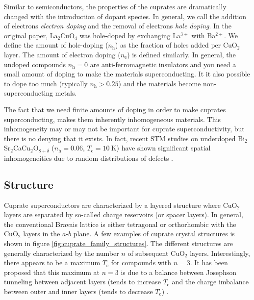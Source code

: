 Similar to semiconductors, the properties of the cuprates are dramatically changed with the introduction of dopant species. In general, we call the addition of electrons \emph{electron doping} and the removal of electrons \emph{hole doping}. In the original paper, La$_2$CuO$_4$ was hole-doped by exchanging La$^{3+}$ with Ba$^{2+}$. We define the amount of hole-doping ($n_\text{h}$) as the fraction of holes added per CuO$_2$ layer. The amount of electron doping ($n_\text{e}$) is defined similarly. In general, the undoped compounds $n_\text{h} = 0$ are anti-ferromagnetic insulators and you need a small amount of doping to make the materials superconducting. It it also possible to dope too much (typically $n_\text{h} > 0.25$) and the materials become non-superconducting metals.

The fact that we need finite amounts of doping in order to make cuprates superconducting, makes them inherently inhomogeneous materials. This inhomogeneity may or may not be important for cuprate superconductivity, but there is no denying that it exists. In fact, recent STM studies on underdoped Bi$_2$Sr$_2$CaCu$_2$O$_{8+\delta}$ ($n_\text{h} = 0.06$, $T_\text{c} = \SI{10}{\kelvin}$) have shown significant spatial inhomogeneities due to random distributions of defects \cite{Ruan2018}. %

\subsection{Structure}
Cuprate superconductors are characterized by a layered structure where CuO$_2$ layers are separated by so-called charge reservoirs (or spacer layers). In general, the conventional Bravais lattice is either tetragonal or orthorhombic with the CuO$_2$ layers in the $a$-$b$ plane. A few examples of cuprate crystal structures is shown in figure \ref{fig:cuprate_family_structures}. The different structures are generally characterized by the number $n$ of subsequent CuO$_2$ layers. Interestingly, there appears to be a maximum $T_\text{c}$ for compounds with $n=3$. It has been proposed that this maximum at $n=3$ is due to a balance between Josephson tunneling between adjacent layers (tends to increase $T_\text{c}$ and the charge imbalance between outer and inner layers (tends to decrease $T_\text{c}$) \cite{Chakravarty2004}.

